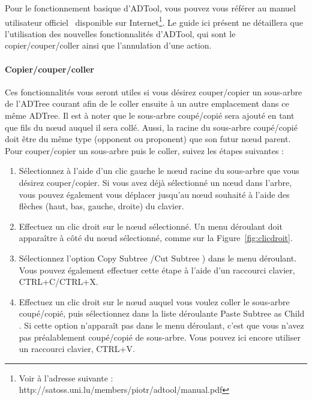 Pour le fonctionnement basique d'ADTool, vous pouvez vous référer au manuel utilisateur officiel~\cite{ADTool_Manual} disponible sur Internet\footnote{Voir à l'adresse suivante : http://satoss.uni.lu/members/piotr/adtool/manual.pdf}. Le guide ici présent ne détaillera que l'utilisation des nouvelles fonctionnalités d'ADTool, qui sont le copier/couper/coller ainsi que l'annulation d'une action.

\paragraph{Copier/couper/coller} Ces fonctionnalités vous seront utiles si vous désirez couper/copier un sous-arbre de l'ADTree courant afin de le coller ensuite à un autre emplacement dans ce même ADTree. Il est à noter que le sous-arbre coupé/copié sera ajouté en tant que fils du n\oe{}ud auquel il sera collé. Aussi, la racine du sous-arbre coupé/copié doit être du même type (opponent ou proponent) que son futur n\oe{}ud parent. Pour couper/copier un sous-arbre puis le coller, suivez les étapes suivantes : 
\begin{enumerate}
    \item Sélectionnez à l'aide d'un clic gauche le n\oe{}ud racine du sous-arbre que vous désirez couper/copier. Si vous avez déjà sélectionné un n\oe{}ud dans l'arbre, vous pouvez également vous déplacer jusqu'au n\oe{}ud souhaité à l'aide des flèches (haut, bas, gauche, droite) du clavier.
	\item Effectuez un clic droit sur le n\oe{}ud sélectionné. Un menu déroulant doit apparaître à côté du n\oe{}ud sélectionné, comme sur la {\sc Figure}~\ref{fig:clicdroit}.
	\item Sélectionnez l'option \og Copy Subtree \fg{}/\og Cut Subtree \fg{}) dans le menu déroulant. Vous pouvez également effectuer cette étape à l'aide d'un raccourci clavier, {\sc CTRL+C}/{\sc CTRL+X}.
	\item Effectuez un clic droit sur le n\oe{}ud auquel vous voulez coller le sous-arbre coupé/copié, puis sélectionnez dans la liste déroulante \og Paste Subtree as Child \fg{}. Si cette option n'apparaît pas dans le menu déroulant, c'est que vous n'avez pas préalablement coupé/copié de sous-arbre. Vous pouvez ici encore utiliser un raccourci clavier, {\sc CTRL+V}.
\end{enumerate}

